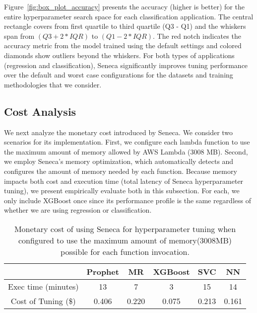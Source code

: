 Figure~\ref{fig:box_plot_accuracy} presents the accuracy (higher is better) 
for the entire hyperparameter search space for each classification
application.  The central rectangle covers from first quartile to third quartile 
(Q3 - Q1) and the whiskers span from \texttt{$(Q3 + 2 * IQR)$} to \texttt{$(Q1 - 2 * IQR)$}. 
The red notch indicates the accuracy metric from the model trained using the default 
settings and colored diamonds show outliers beyond the whiskers.
For both types of applications (regression and classification), Seneca significantly
improves tuning performance over the default and worst case configurations for the 
datasets and training methodologies that we consider.  

\subsection{Cost Analysis}

We next analyze the monetary cost introduced by Seneca. 
We consider two scenarios for its implementation.
First, we configure each lambda function to use the maximum amount
of memory allowed by AWS Lambda (3008 MB).  Second, we employ Seneca's memory optimization,
which automatically detects and configures the amount of memory needed by each function.
Because memory impacts both cost and execution time (total latency of Seneca 
hyperparameter tuning), we present empirically evaluate both 
in this subsection.  For each, we only include XGBoost once since its 
performance profile is the same
regardless of whether we are using regression or classification.

\begin{table}
\centering
\begin{tabular}{|c|c|c|c|c|c|}
\hline
& Prophet & MR & XGBoost & SVC & NN\\
\hline
\hline
Exec time (minutes)& 13 & 7 & 3 & 15 & 14 \\
\hline
Cost of Tuning (\$) &0.406 & 0.220 & 0.075 & 0.213 & 0.161 \\
\hline
\end{tabular}
\caption{Monetary cost of using Seneca for hyperparameter 
tuning when configured to use the maximum amount of memory(3008MB) 
possible for each function invocation. 
\label{tab:cost_max_memory}}
\vspace{-0.2in}
\end{table}


